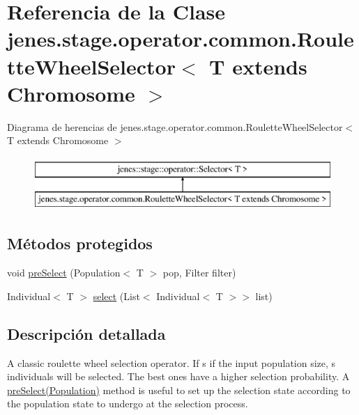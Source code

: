 \hypertarget{classjenes_1_1stage_1_1operator_1_1common_1_1_roulette_wheel_selector_3_01_t_01extends_01_chromosome_01_4}{\section{Referencia de la Clase jenes.\-stage.\-operator.\-common.\-Roulette\-Wheel\-Selector$<$ T extends Chromosome $>$}
\label{classjenes_1_1stage_1_1operator_1_1common_1_1_roulette_wheel_selector_3_01_t_01extends_01_chromosome_01_4}
}
Diagrama de herencias de jenes.\-stage.\-operator.\-common.\-Roulette\-Wheel\-Selector$<$ T extends Chromosome $>$\begin{figure}[H]
\begin{center}
\leavevmode
\includegraphics[height=2.000000cm]{classjenes_1_1stage_1_1operator_1_1common_1_1_roulette_wheel_selector_3_01_t_01extends_01_chromosome_01_4}
\end{center}
\end{figure}
\subsection*{Métodos protegidos}
\begin{DoxyCompactItemize}
\item 
void \hyperlink{classjenes_1_1stage_1_1operator_1_1common_1_1_roulette_wheel_selector_3_01_t_01extends_01_chromosome_01_4_a13a6b76fa77779367d05a063ff6191bf}{pre\-Select} (Population$<$ T $>$ pop, Filter filter)
\item 
Individual$<$ T $>$ \hyperlink{classjenes_1_1stage_1_1operator_1_1common_1_1_roulette_wheel_selector_3_01_t_01extends_01_chromosome_01_4_ad74c66e053cb97c75ce8a9f78a8208e5}{select} (List$<$ Individual$<$ T $>$$>$ list)
\end{DoxyCompactItemize}


\subsection{Descripción detallada}
A classic roulette wheel selection operator. If s if the input population size, s individuals will be selected. The best ones have a higher selection probability. A \hyperlink{}{pre\-Select(\-Population)} method is useful to set up the selection state according to the population state to undergo at the selection process. 


